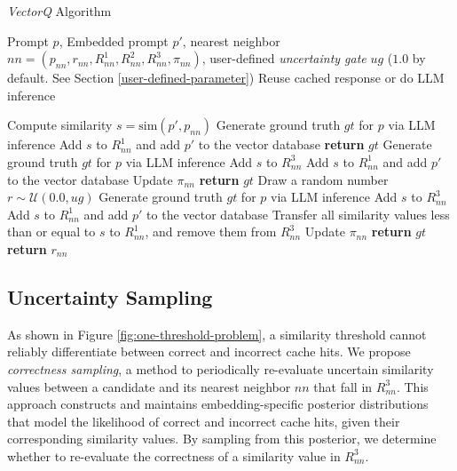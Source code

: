 \begin{algorithm}[t]
\caption{\textit{VectorQ} Algorithm}
\label{alg:vectorq-regions}
\begin{algorithmic}[1]
\REQUIRE Prompt $p$, Embedded prompt $p'$, nearest neighbor $nn = (p_{nn}, r_{nn}, R_{nn}^{1}, R_{nn}^{2}, R_{nn}^{3}, \pi_{nn})$, user-defined \textit{uncertainty gate} $ug$ ($1.0$ by default. See Section \ref{user-defined-parameter})
\ENSURE Reuse cached response or do LLM inference

\STATE Compute similarity $s = \text{sim}(p', p_{nn})$
    \STATE Generate ground truth $gt$ for $p$ via LLM inference
    \STATE Add $s$ to $R_{nn}^1$ and add $p'$ to the vector database
    \STATE \textbf{return} $gt$
    \STATE Generate ground truth $gt$ for $p$ via LLM inference
        \STATE Add $s$ to $R_{nn}^3$
    \ELSE
        \STATE Add $s$ to $R_{nn}^1$ and add $p'$ to the vector database
    \ENDIF
    \STATE Update $\pi_{nn}$
    \STATE \textbf{return} $gt$
    \STATE Draw a random number $r \sim \mathcal{U}(0.0, ug)$
        \STATE Generate ground truth $gt$ for $p$ via LLM inference
            \STATE Add $s$ to $R_{nn}^3$
        \ELSE
            \STATE Add $s$ to $R_{nn}^1$ and add $p'$ to the vector database
            \STATE Transfer all similarity values less than or equal to $s$ to $R_{nn}^1$, and remove them from $R_{nn}^3$
        \ENDIF
        \STATE Update $\pi_{nn}$
        \STATE \textbf{return} $gt$
    \ELSE
        \STATE \textbf{return} $r_{nn}$
    \ENDIF
\ENDIF
\end{algorithmic}
\end{algorithm}


\subsection{Uncertainty Sampling}
\label{correctness-sampling}
As shown in Figure \ref{fig:one-threshold-problem}, a similarity threshold cannot reliably differentiate between correct and incorrect cache hits. We propose \textit{correctness sampling}, a method to periodically re-evaluate uncertain similarity values between a candidate and its nearest neighbor $nn$ that fall in $R_{nn}^3$. This approach constructs and maintains embedding-specific posterior distributions that model the likelihood of correct and incorrect cache hits, given their corresponding similarity values. By sampling from this posterior, we determine whether to re-evaluate the correctness of a similarity value in $R_{nn}^3$.

